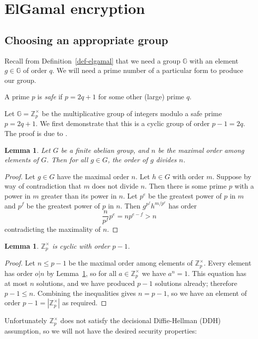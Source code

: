 \documentclass[11pt,twoside,a4paper]{article}
\newtheorem{lemma}[theorem]{Lemma}
\theoremstyle{definition}
\begin{document}
\section{ElGamal encryption}\label{app-elgamal}
\subsection{Choosing an appropriate group}
Recall from Definition~\ref{def-elgamal} that we need a group $\mathbb{G}$ with an element $g\in\mathbb{G}$ of order $q$. We will need a prime number of a particular form to produce our group.
\begin{definition}
    A prime $p$ is \textit{safe} if $p=2q+1$ for some other (large) prime $q$.
\end{definition}
Let $\mathbb{G}=\mathbb{Z}^\times_p$ be the multiplicative group of integers modulo a safe prime $p=2q+1$. We first demonstrate that this is a cyclic group of order $p-1=2q$. The proof is due to \cite{cyclicity}.
\begin{lemma}\label{lem-order-divides}
    Let $G$ be a finite abelian group, and $n$ be the maximal order among elements of $G$. Then for all $g\in G$, the order of $g$ divides $n$.
\end{lemma}
\begin{proof}
    Let $g\in G$ have the maximal order $n$. Let $h\in G$ with order $m$. Suppose by way of contradiction that $m$ does not divide $n$. Then there is some prime $p$ with a power in $m$ greater than its power in $n$. Let $p^e$ be the greatest power of $p$ in $m$ and $p^f$ be the greatest power of $p$ in $n$. Then $g^{p^f}h^{m/p^e}$ has order
    $$\frac{n}{p^f}p^e=np^{e-f}>n$$
    contradicting the maximality of $n$.
\end{proof}
\begin{lemma}
    $\mathbb{Z}^\times_p$ is cyclic with order $p-1$.
\end{lemma}
\begin{proof}
    Let $n\leq p-1$ be the maximal order among elements of $\mathbb{Z}^\times_p$. Every element has order $o\vert n$ by Lemma~\ref{lem-order-divides}, so for all $a\in\mathbb{Z}^\times_p$ we have $a^n=1$. This equation has at most $n$ solutions, and we have produced $p-1$ solutions already; therefore $p-1\leq n$.
    Combining the inequalities gives $n=p-1$, so we have an element of order $p-1=|\mathbb{Z}^\times_p|$ as required.
\end{proof}
Unfortunately $\mathbb{Z}^\times_p$ does not satisfy the decisional Diffie-Hellman (DDH) assumption, so we will not have the desired security properties:
\end{document}

